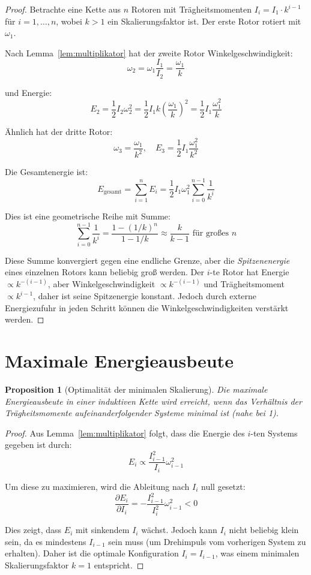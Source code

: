 \documentclass[12pt,a4paper]{report}
\theoremstyle{plain}
\newtheorem{proposition}[theorem]{Proposition}
\theoremstyle{definition}
\theoremstyle{remark}
\begin{document}
\begin{proof}
	Betrachte eine Kette aus $n$ Rotoren mit Trägheitsmomenten $I_i = I_1 \cdot k^{i-1}$ für $i = 1, \ldots, n$, wobei $k > 1$ ein Skalierungsfaktor ist. Der erste Rotor rotiert mit $\omega_1$.
	
	Nach Lemma~\ref{lem:multiplikator} hat der zweite Rotor Winkelgeschwindigkeit:
	\[
	\omega_2 = \omega_1 \frac{I_1}{I_2} = \frac{\omega_1}{k}
	\]
	
	und Energie:
	\[
	E_2 = \frac{1}{2} I_2 \omega_2^2 = \frac{1}{2} I_1 k \left(\frac{\omega_1}{k}\right)^2 = \frac{1}{2} I_1 \frac{\omega_1^2}{k}
	\]
	
	Ähnlich hat der dritte Rotor:
	\[
	\omega_3 = \frac{\omega_1}{k^2}, \quad E_3 = \frac{1}{2} I_1 \frac{\omega_1^2}{k^2}
	\]
	
	Die Gesamtenergie ist:
	\[
	E_{\text{gesamt}} = \sum_{i=1}^{n} E_i = \frac{1}{2} I_1 \omega_1^2 \sum_{i=0}^{n-1} \frac{1}{k^i}
	\]
	
	Dies ist eine geometrische Reihe mit Summe:
	\[
	\sum_{i=0}^{n-1} \frac{1}{k^i} = \frac{1 - (1/k)^n}{1 - 1/k} \approx \frac{k}{k-1} \text{ für großes } n
	\]
	
	Diese Summe konvergiert gegen eine endliche Grenze, aber die \emph{Spitzenenergie} eines einzelnen Rotors kann beliebig groß werden. Der $i$-te Rotor hat Energie $\propto k^{-(i-1)}$, aber Winkelgeschwindigkeit $\propto k^{-(i-1)}$ und Trägheitsmoment $\propto k^{i-1}$, daher ist seine Spitzenergie konstant. Jedoch durch externe Energiezufuhr in jeden Schritt können die Winkelgeschwindigkeiten verstärkt werden.
\end{proof}

\section{Maximale Energieausbeute}

\begin{proposition}[Optimalität der minimalen Skalierung]
	Die maximale Energieausbeute in einer induktiven Kette wird erreicht, wenn das Verhältnis der Trägheitsmomente aufeinanderfolgender Systeme minimal ist (nahe bei 1).
\end{proposition}

\begin{proof}
	Aus Lemma~\ref{lem:multiplikator} folgt, dass die Energie des $i$-ten Systems gegeben ist durch:
	\[
	E_i \propto \frac{I_{i-1}^2}{I_i} \omega_{i-1}^2
	\]
	
	Um diese zu maximieren, wird die Ableitung nach $I_i$ null gesetzt:
	\[
	\frac{\partial E_i}{\partial I_i} = -\frac{I_{i-1}^2}{I_i^2} \omega_{i-1}^2 < 0
	\]
	
	Dies zeigt, dass $E_i$ mit sinkendem $I_i$ wächst. Jedoch kann $I_i$ nicht beliebig klein sein, da es mindestens $I_{i-1}$ sein muss (um Drehimpuls vom vorherigen System zu erhalten). Daher ist die optimale Konfiguration $I_i = I_{i-1}$, was einem minimalen Skalierungsfaktor $k = 1$ entspricht.
\end{proof}
\end{document}
